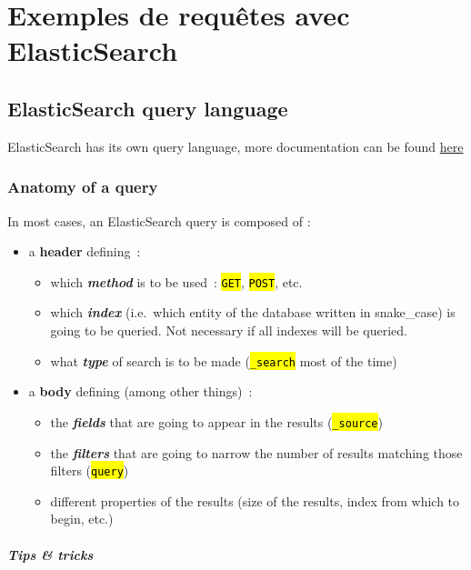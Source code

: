 \documentclass[a4paper,12pt,twoside]{book}
\let\OldTexttt\texttt
\renewcommand{\texttt}[1]{\OldTexttt{\hl{#1}}}
\begin{document}
	\chapter{\label{ElasticSearch}Exemples de requêtes avec ElasticSearch}
		\section{ElasticSearch query language}\label{elasticsearch-query-language}
	
	ElasticSearch has its own query language, more documentation can be
	found \href{https://www.elastic.co/guide/en/elasticsearch/reference/current/query-dsl.html}{here}
	
			\subsection{Anatomy of a query}\label{anatomy-of-a-query}
	
	In most cases, an ElasticSearch query is composed of :
	\begin{itemize}
		\item a \textbf{header} defining~:
		\begin{itemize}
			\item which \textbf{\emph{method}} is to be used~: \texttt{GET}, \texttt{POST}, etc.
			\item which \textbf{\emph{index}} (i.e.~which entity of the database written in snake\_case) is going to be queried. Not necessary if all indexes will be queried.
			\item what \textbf{\emph{type}} of search is to be made (\texttt{\_search} most of the time)
		\end{itemize}
		\item a \textbf{body} defining (among other things)~:
		\begin{itemize}
			\item the \textbf{\emph{fields}} that are going to appear in the results (\texttt{\_source})
			\item the \textbf{\emph{filters}} that are going to narrow the number of results matching those filters (\texttt{query})
			\item different properties of the results (size of the results, index from which to begin, etc.)
		\end{itemize}
	\end{itemize}

				\paragraph{Tips \& tricks}\label{tips-tricks}
\end{document}
